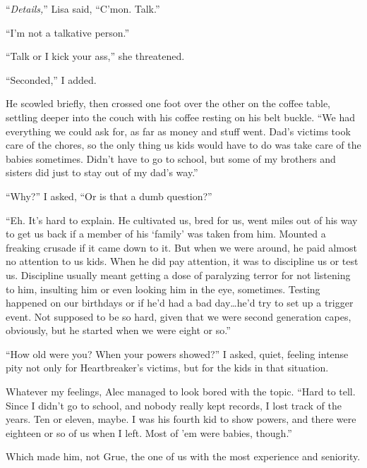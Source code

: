 ``\emph{Details,}'' Lisa said, ``C'mon.  Talk.''



``I'm not a talkative person.''



``Talk or I kick your ass,'' she threatened.



``Seconded,'' I added.



He scowled briefly, then crossed one foot over the other on the coffee table, settling deeper into the couch with his coffee resting on his belt buckle.  ``We had everything we could ask for, as far as money and stuff went.  Dad's victims took care of the chores, so the only thing us kids would have to do was take care of the babies sometimes.  Didn't have to go to school, but some of my brothers and sisters did just to stay out of my dad's way.''



``Why?'' I asked, ``Or is that a dumb question?''



``Eh.  It's hard to explain.  He cultivated us, bred for us, went miles out of his way to get us back if a member of his `family' was taken from him.  Mounted a freaking crusade if it came down to it.  But when we were around, he paid almost no attention to us kids.  When he did pay attention, it was to discipline us or test us.  Discipline usually meant getting a dose of paralyzing terror for not listening to him, insulting him or even looking him in the eye, sometimes.  Testing happened on our birthdays or if he'd had a bad day\ldots he'd try to set up a trigger event.  Not supposed to be so hard, given that we were second generation capes, obviously, but he started when we were eight or so.''



``How old were you?  When your powers showed?'' I asked, quiet, feeling intense pity not only for Heartbreaker's victims, but for the kids in that situation.



Whatever my feelings, Alec managed to look bored with the topic.  ``Hard to tell.  Since I didn't go to school, and nobody really kept records, I lost track of the years.  Ten or eleven, maybe.  I was his fourth kid to show powers, and there were eighteen or so of us when I left.  Most of 'em were babies, though.''



Which made him, not Grue, the one of us with the most experience and seniority.



